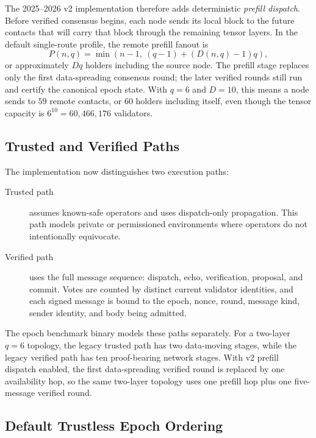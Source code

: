 The 2025--2026 v2 implementation therefore adds deterministic
\emph{prefill dispatch}. Before verified consensus begins, each node sends its
local block to the future contacts that will carry that block through the
remaining tensor layers. In the default single-route profile, the remote
prefill fanout is
\[
P(n,q)=\min \left(n-1,\ (q-1)+(D(n,q)-1)q\right),
\]
or approximately \(Dq\) holders including the source node. The prefill stage
replaces only the first data-spreading consensus round; the later verified
rounds still run and certify the canonical epoch state. With \(q=6\) and
\(D=10\), this means a node sends to \(59\) remote contacts, or \(60\) holders
including itself, even though the tensor capacity is
\(6^{10}=60{,}466{,}176\) validators.



\subsection{Trusted and Verified Paths}

The implementation now distinguishes two execution paths:

\begin{description}
\item[Trusted path] assumes known-safe operators and uses dispatch-only
propagation. This path models private or permissioned environments where
operators do not intentionally equivocate.
\item[Verified path] uses the full message sequence: dispatch, echo,
verification, proposal, and commit. Votes are counted by distinct current
validator identities, and each signed message is bound to the epoch, nonce,
round, message kind, sender identity, and body being admitted.
\end{description}

The epoch benchmark binary models these paths separately. For a two-layer
\(q=6\) topology, the legacy trusted path has two data-moving stages, while
the legacy verified path has ten proof-bearing network stages. With v2 prefill
dispatch enabled, the first data-spreading verified round is replaced by one
availability hop, so the same two-layer topology uses one prefill hop plus one
five-message verified round.

\subsection{Default Trustless Epoch Ordering}

